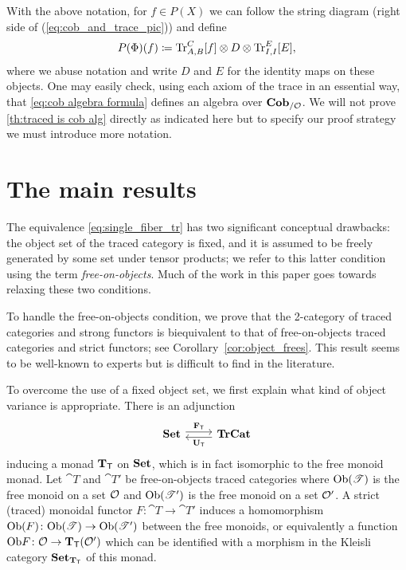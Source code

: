 \documentclass[11pt,oneside,article]{memoir}
\begin{document}
With the above notation, for $f\in P(X)$ we can follow the string diagram (right side of
(\ref{eq:cob_and_trace_pic})) and define
\begin{equation}
      \label{eq:cob algebra formula}
   P(\Phi)(f)\coloneqq\operatorname{Tr}_{A,B}^C[f]\otimes D\otimes\operatorname{Tr}^E_{I,I}[E],
\end{equation}
where we abuse notation and write $D$ and $E$ for the identity maps on these objects. One may easily
check, using each axiom of the trace \cite{JoyalStreetVerity} in an essential way, that
\eqref{eq:cob algebra formula} defines an algebra over $\mathbf{Cob}_{/\mathcal{O}}$. We will not prove
\ref{th:traced is cob alg} directly as indicated here but to specify our proof strategy we must
introduce more notation.

\section{The main results}
    \label{sec:main_results}

The equivalence \eqref{eq:single_fiber_tr} has two significant conceptual drawbacks: the object set
of the traced category is fixed, and it is assumed to be freely generated by some set under tensor
products; we refer to this latter condition using the term \emph{free-on-objects}. Much of the work
in this paper goes towards relaxing these two conditions.

To handle the free-on-objects condition, we prove that the 2-category of traced categories and
strong functors is biequivalent to that of free-on-objects traced categories and strict functors;
see Corollary~\ref{cor:object_frees}. This result seems to be well-known to experts but is difficult
to find in the literature.

To overcome the use of a fixed object set, we first explain what kind of object variance is
appropriate. There is an adjunction
\[
  \Adjoint{\Set}{\TrCat}{\FT}{\UT}
\]
inducing a monad $\mathbf{T}_{\mathsf{T}}$ on $\mathbf{Set}$, which is in fact isomorphic to the free monoid monad. Let
$\cat{T}$ and $\cat{T}'$ be free-on-objects traced categories where $\mathrm{Ob}(\mathscr{T})$ is the free
monoid on a set $\mathcal{O}$ and $\mathrm{Ob}(\mathscr{T}')$ is the free monoid on a set $\mathcal{O}'$. A strict
(traced) monoidal functor $F\colon \cat{T}\to \cat{T}'$ induces a homomorphism
$\mathrm{Ob}(F)\colon\mathrm{Ob}(\mathscr{T})\to\mathrm{Ob}(\mathscr{T}')$ between the free monoids, or equivalently a function $\mathrm{Ob}
F\colon\mathcal{O}\to\mathbf{T}_{\mathsf{T}}(\mathcal{O}')$ which can be identified with a morphism in the Kleisli category
$\mathbf{Set}_{\mathbf{T}_{\mathsf{T}}}$ of this monad.
\end{document}
